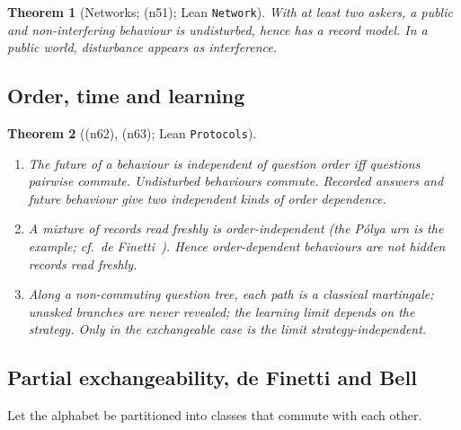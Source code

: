 \documentclass[11pt]{article}
\newtheorem{theorem}{Theorem}[section]
\theoremstyle{definition}
\theoremstyle{remark}
\newcommand{\lean}[1]{\texttt{#1}}
\newcommand{\note}[1]{\textsf{(n#1)}}
\begin{document}
\begin{theorem}[Networks; \note{51}; Lean \lean{Network}]
With at least two askers, a public and non-interfering behaviour is undisturbed, hence has a record model. In a public world, disturbance appears as interference.
\end{theorem}

\subsection{Order, time and learning}

\begin{theorem}[\note{62}, \note{63}; Lean \lean{Protocols}]
\leavevmode
\begin{enumerate}
\item The future of a behaviour is independent of question order iff questions pairwise commute. Undisturbed behaviours commute. Recorded answers and future behaviour give two independent kinds of order dependence.
\item A mixture of records read freshly is order-independent (the P\'olya urn is the example; cf.\ de Finetti~\cite{deFinetti37,HewittSavage55}). Hence order-dependent behaviours are not hidden records read freshly.
\item Along a non-commuting question tree, each path is a classical martingale; unasked branches are never revealed; the learning limit depends on the strategy. Only in the exchangeable case is the limit strategy-independent.
\end{enumerate}
\end{theorem}

\subsection{Partial exchangeability, de Finetti and Bell}

Let the alphabet be partitioned into classes that commute with each other.
\end{document}
